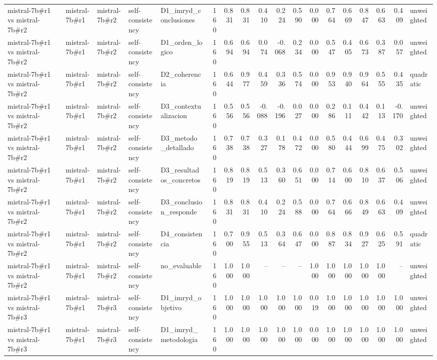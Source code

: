 \begin{table}
{\begin{tabular}{lllllrrrrrrrrrrrrl}
mistral-7b\#r1 vs mistral-7b\#r2 & mistral-7b\#r1 & mistral-7b\#r2 & self-consistency & D1\_imryd\_conclusiones & 160 & 0.831 & 0.831 & 0.410 & 0.224 & 0.590 & 0.000 & 0.764 & 0.669 & 0.847 & 0.663 & 0.409 & unweighted \\
mistral-7b\#r1 vs mistral-7b\#r2 & mistral-7b\#r1 & mistral-7b\#r2 & self-consistency & D1\_orden\_logico & 160 & 0.694 & 0.694 & 0.074 & -0.068 & 0.234 & 0.000 & 0.547 & 0.405 & 0.673 & 0.387 & 0.057 & unweighted \\
mistral-7b\#r1 vs mistral-7b\#r2 & mistral-7b\#r1 & mistral-7b\#r2 & self-consistency & D2\_coherencia & 160 & 0.644 & 0.977 & 0.459 & 0.336 & 0.574 & 0.000 & 0.953 & 0.940 & 0.964 & 0.555 & 0.435 & quadratic \\
mistral-7b\#r1 vs mistral-7b\#r2 & mistral-7b\#r1 & mistral-7b\#r2 & self-consistency & D3\_contextualizacion & 160 & 0.556 & 0.556 & -0.088 & -0.196 & 0.027 & 0.000 & 0.286 & 0.111 & 0.442 & 0.113 & -0.170 & unweighted \\
mistral-7b\#r1 vs mistral-7b\#r2 & mistral-7b\#r1 & mistral-7b\#r2 & self-consistency & D3\_metodo\_detallado & 160 & 0.738 & 0.738 & 0.327 & 0.178 & 0.472 & 0.000 & 0.580 & 0.444 & 0.699 & 0.475 & 0.302 & unweighted \\
mistral-7b\#r1 vs mistral-7b\#r2 & mistral-7b\#r1 & mistral-7b\#r2 & self-consistency & D3\_resultados\_concretos & 160 & 0.819 & 0.819 & 0.513 & 0.360 & 0.651 & 0.000 & 0.714 & 0.600 & 0.810 & 0.637 & 0.506 & unweighted \\
mistral-7b\#r1 vs mistral-7b\#r2 & mistral-7b\#r1 & mistral-7b\#r2 & self-consistency & D3\_conclusion\_responde & 160 & 0.831 & 0.831 & 0.410 & 0.224 & 0.588 & 0.000 & 0.764 & 0.666 & 0.849 & 0.663 & 0.409 & unweighted \\
mistral-7b\#r1 vs mistral-7b\#r2 & mistral-7b\#r1 & mistral-7b\#r2 & self-consistency & D4\_consistencia & 160 & 0.700 & 0.955 & 0.513 & 0.364 & 0.647 & 0.000 & 0.887 & 0.834 & 0.927 & 0.625 & 0.591 & quadratic \\
mistral-7b\#r1 vs mistral-7b\#r2 & mistral-7b\#r1 & mistral-7b\#r2 & self-consistency & no\_evaluable & 160 & 1.000 & 1.000 & -- & -- & -- & 1.000 & 1.000 & 1.000 & 1.000 & 1.000 & -- & unweighted \\
mistral-7b\#r1 vs mistral-7b\#r3 & mistral-7b\#r1 & mistral-7b\#r3 & self-consistency & D1\_imryd\_objetivo & 160 & 1.000 & 1.000 & 1.000 & 1.000 & 1.000 & 0.019 & 1.000 & 1.000 & 1.000 & 1.000 & 1.000 & unweighted \\
mistral-7b\#r1 vs mistral-7b\#r3 & mistral-7b\#r1 & mistral-7b\#r3 & self-consistency & D1\_imryd\_metodologia & 160 & 1.000 & 1.000 & 1.000 & 1.000 & 1.000 & 0.000 & 1.000 & 1.000 & 1.000 & 1.000 & 1.000 & unweighted \\

\end{tabular}}
\end{table}
